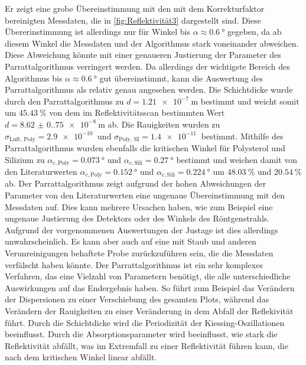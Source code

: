 Er zeigt eine grobe Übereinstimmung mit den mit dem Korrekturfaktor bereinigten Messdaten, die in \autoref{fig:Reflektivität3} dargestellt sind. 
Diese Übererinstimmung ist allerdings nur für Winkel bis $\alpha \approx \SI{0.6}{\degree}$ gegeben, da ab diesem Winkel die Messdaten und der Algorithmus stark voneinander abweichen.
Diese Abweichung könnte mit einer genaueren Justierung der Parameter des Parrattalgorithmus verringert werden.
Da allerdings der wichtigste Bereich des Algorithmus bis $\alpha \approx \SI{0.6}{\degree}$ gut übereinstimmt, kann die Auswertung des Parrattalgorithmus als relativ genau angesehen werden. \newline
Die Schichtdicke wurde durch den Parrattalgorithmus zu $d = \SI{1.21e-7}{\meter}$ bestimmt und weicht somit um $\SI{45.43}{\percent}$ von dem im Reflektivitätsscan bestimmten Wert $d = \SI{8.62(0.75)e-8}{\meter}$ ab.
Die Rauigkeiten wurden zu $\sigma_{\text{Luft, Poly}} = \SI{2.9e-10}{}$ und $\sigma_{\text{Poly, SI}} = \SI{1.4e-11}{}$ bestimmt.
Mithilfe des Parrattalgorithmus wurden ebenfalls die kritischen Winkel für Polysterol und Silizium zu $\alpha_{c,\text{Poly}} = \SI{0.073}{\degree}$ und $\alpha_{c,\text{Sili}} = \SI{0.27}{\degree}$ bestimmt und weichen damit von den Literaturwerten $\alpha_{c,\text{Poly}} = \SI{0.152}{\degree}$ und $\alpha_{c,\text{Sili}} = \SI{0.224}{\degree}$ \cite{GISAXS} um $\SI{48.03}{\percent}$ und $\SI{20.54}{\percent}$ ab.
Der Parrattalgorithmus zeigt aufgrund der hohen Abweichungen der Parameter von den Literaturwerten eine ungenaue Übereinstimmung mit den Messdaten auf.
Dies kann mehrere Ursachen haben, wie zum Beispiel eine ungenaue Justierung des Detektors oder des Winkels des Röntgenstrahls.
Aufgrund der vorgenommenen Auswertungen der Justage ist dies allerdings unwahrscheinlich.
Es kann aber auch auf eine mit Staub und anderen Verunreinigungen behaftete Probe zurückzuführen sein, die die Messdaten verfälscht haben könnte.
Der Parrattalgorithmus ist ein sehr komplexes Verfahren, das eine Vielzahl von Parametern benötigt, die alle unterschiedliche Auswirkungen auf das Endergebnis haben.
So führt zum Beispiel das Verändern der Dispersionen zu einer Verschiebung des gesamten Plots, während das Verändern der Rauigkeiten zu einer Veränderung in dem Abfall der Reflekivität führt.
Durch die Schichtdicke wird die Periodizität der Kiessing-Oszillationen beeinflusst.
Durch die Absorptionsparameter wird beeinflusst, wie stark die Reflektivität abfällt, was im Extremfall zu einer Reflektivität führen kann, die nach dem kritischen Winkel linear abfällt.
